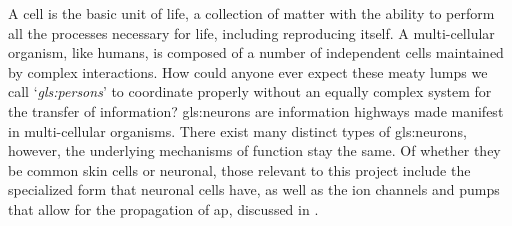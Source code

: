 \documentclass[class={myRUCProject}, crop=false]{standalone}
\begin{document}
A cell is the basic unit of life, a collection of matter with the ability to perform all the processes necessary for life, including reproducing itself.
A multi-cellular organism, like humans, is composed of a number of independent cells maintained by complex interactions. How could anyone ever expect these meaty lumps we call `\textit{\glspl{gls:person}}' to coordinate properly without an equally complex system for the transfer of information? 
\Glspl{gls:neuron} are information highways made manifest in multi-cellular organisms. 
There exist many distinct types of \glspl{gls:neuron}, however, the underlying mechanisms of function stay the same.
Of whether they be common skin cells or neuronal, those relevant to this project include the specialized form that neuronal cells have, as well as the ion channels and pumps that allow for the propagation of \gls{ap}, discussed in .






\end{document}
